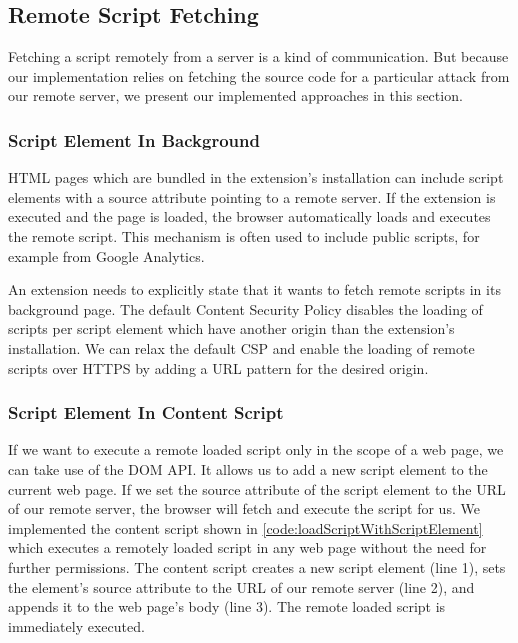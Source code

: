 \subsection{Remote Script Fetching}
		
	Fetching a script remotely from a server is a kind of communication. But because our implementation relies on fetching the source code for a particular attack from our remote server, we present our implemented approaches in this section.
	
\subsubsection{Script Element In Background}
	
	HTML pages which are bundled in the extension's installation can include script elements with a source attribute pointing to a remote server. If the extension is executed and the page is loaded, the browser automatically loads and executes the remote script. This mechanism is often used to include public scripts, for example from Google Analytics. 
	
	An extension needs to explicitly state that it wants to fetch remote scripts in its background page. The default Content Security Policy disables the loading of scripts per script element which have another origin than the extension's installation. We can relax the default CSP and enable the loading of remote scripts over HTTPS by adding a URL pattern for the desired origin. 
	
\subsubsection{Script Element In Content Script}

	If we want to execute a remote loaded script only in the scope of a web page, we can take use of the DOM API. It allows us to add a new script element to the current web page. If we set the source attribute of the script element to the URL of our remote server, the browser will fetch and execute the script for us. We implemented the content script shown in \autoref{code:loadScriptWithScriptElement} which executes a remotely loaded script in any web page without the need for further permissions. The content script creates a new script element (line 1), sets the element's source attribute to the URL of our remote server (line 2), and appends it to the web page's body (line 3). The remote loaded script is immediately executed.
	
